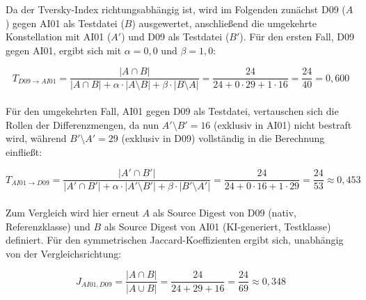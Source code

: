 Da der Tversky-Index richtungsabhängig ist, wird im Folgenden zunächst D09 (\(A\)) gegen AI01 als Testdatei (\(B\)) ausgewertet, anschließend die umgekehrte Konstellation mit AI01 (\(A'\)) und D09 als Testdatei (\(B'\)). Für den ersten Fall, D09 gegen AI01, ergibt sich mit \(\alpha = 0{,}0\) und \(\beta = 1{,}0\):

\begin{equation}
T_{D09 \to AI01} = \dfrac{|A \cap B|}{|A \cap B| + \alpha \cdot |A \setminus B| + \beta \cdot |B \setminus A|} = \dfrac{24}{24 + 0 \cdot 29 + 1 \cdot 16} = \dfrac{24}{40} = 0{,}600
\label{eq:tversky_d09_ai01}
\end{equation}\\

Für den umgekehrten Fall, AI01 gegen D09 als Testdatei, vertauschen sich die Rollen der Differenzmengen, da nun \(A' \setminus B' = 16\) (exklusiv in AI01) nicht bestraft wird, während \(B' \setminus A' = 29\) (exklusiv in D09) vollständig in die Berechnung einfließt:

\begin{equation}
T_{AI01 \to D09} = \dfrac{|A' \cap B'|}{|A' \cap B'| + \alpha \cdot |A' \setminus B'| + \beta \cdot |B' \setminus A'|} = \dfrac{24}{24 + 0 \cdot 16 + 1 \cdot 29} = \dfrac{24}{53} \approx 0{,}453
\label{eq:tversky_ai01_d09}
\end{equation}\\

Zum Vergleich wird hier erneut \(A\) als Source Digest von D09 (nativ, Referenzklasse) und \(B\) als Source Digest von AI01 (KI-generiert, Testklasse) definiert. Für den symmetrischen Jaccard-Koeffizienten ergibt sich, unabhängig von der Vergleichsrichtung:

\begin{equation}
J_{AI01, D09} = \dfrac{|A \cap B|}{|A \cup B|} = \dfrac{24}{24 + 29 + 16} = \dfrac{24}{69} \approx 0{,}348
\label{eq:jaccard_d09ai01}
\end{equation}\\

